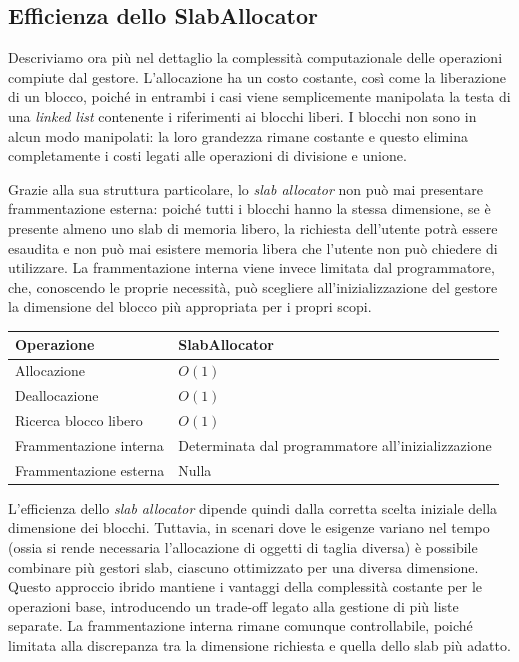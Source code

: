 \subsection*{Efficienza dello SlabAllocator}
Descriviamo ora più nel dettaglio la complessità computazionale delle operazioni compiute dal gestore. L’allocazione ha un costo costante, così come la liberazione di un blocco, poiché in entrambi i casi viene semplicemente manipolata la testa di una \textit{linked list} contenente i riferimenti ai blocchi liberi. I blocchi non sono in alcun modo manipolati: la loro grandezza rimane costante e questo elimina completamente i costi legati alle operazioni di divisione e unione.

Grazie alla sua struttura particolare, lo \textit{slab allocator} non può mai presentare frammentazione esterna: poiché tutti i blocchi hanno la stessa dimensione, se è presente almeno uno slab di memoria libero, la richiesta dell’utente potrà essere esaudita e non può mai esistere memoria libera che l’utente non può chiedere di utilizzare. La frammentazione interna viene invece limitata dal programmatore, che, conoscendo le proprie necessità, può scegliere all’inizializzazione del gestore la dimensione del blocco più appropriata per i propri scopi.

\begin{center}
\begin{tabular}{|l|l|}
\hline
Operazione & SlabAllocator \\
\hline
Allocazione & $O(1)$ \\
Deallocazione & $O(1)$ \\
Ricerca blocco libero & $O(1)$ \\
Frammentazione interna & Determinata dal programmatore all'inizializzazione \\
Frammentazione esterna & Nulla \\
\hline
\end{tabular}
\end{center}

L’efficienza dello \textit{slab allocator} dipende quindi dalla corretta scelta iniziale della dimensione dei blocchi. Tuttavia, in scenari dove le esigenze variano nel tempo (ossia si rende necessaria l’allocazione di oggetti di taglia diversa) è possibile combinare più gestori slab, ciascuno ottimizzato per una diversa dimensione. Questo approccio ibrido mantiene i vantaggi della complessità costante per le operazioni base, introducendo un trade-off legato alla gestione di più liste separate. La frammentazione interna rimane comunque controllabile, poiché limitata alla discrepanza tra la dimensione richiesta e quella dello slab più adatto.

